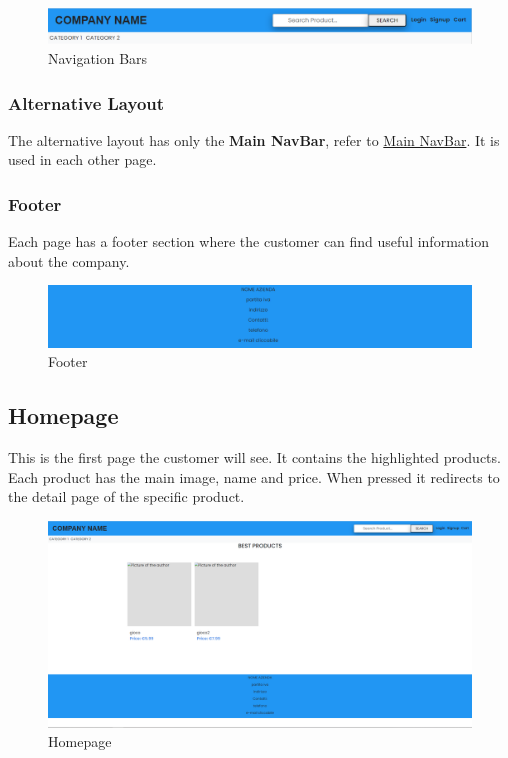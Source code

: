 \begin{figure}[H]
    \centering
    \includegraphics[width=\linewidth]{res/images/cliente/navigationbars.png}
    \caption{Navigation Bars}
\end{figure}

\subsubsection{Alternative Layout}
The alternative layout has only the \textbf{Main NavBar}, refer to \hyperref[_mainLayout]{Main NavBar}. It is used in each other page.

\subsubsection{Footer}
Each page has a footer section where the customer can find useful information about the company.

\begin{figure}[H]
    \centering
    \includegraphics[width=\linewidth]{res/images/cliente/footer.png}
    \caption{Footer}
\end{figure}

\subsection{Homepage}
This is the first page the customer will see. It contains the highlighted products. Each product has the main image, name and price. When pressed it redirects to the detail page of the specific product.

\begin{figure}[H]
    \centering
    \includegraphics[width=\linewidth]{res/images/cliente/homepage.png}
    \caption{Homepage}
\end{figure}

